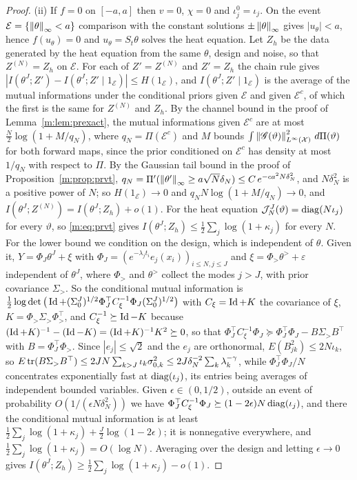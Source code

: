 \begin{proof}
(ii) If $f=0$ on $[-a,a]$ then $v=0$, $\chi=0$ and $\iota^0_j=\iota_j$. On the event $\mathcal E=\{\left\|\theta\right\|_\infty<a\}$ comparison with the constant solutions $\pm\left\|\theta\right\|_\infty$ gives $|u_\theta|<a$, hence $f(u_\theta)=0$ and $u_\theta=S_t\theta$ solves the heat equation. Let $Z_h$ be the data generated by the heat equation from the same $\theta$, design and noise, so that $Z^{(N)}=Z_h$ on $\mathcal E$. For each of $Z'=Z^{(N)}$ and $Z'=Z_h$ the chain rule gives $|I(\theta^J;Z')-I(\theta^J;Z'\mid1_{\mathcal E})|\le H(1_{\mathcal E})$, and $I(\theta^J;Z'\mid1_{\mathcal E})$ is the average of the mutual informations under the conditional priors given $\mathcal E$ and given $\mathcal E^c$, of which the first is the same for $Z^{(N)}$ and $Z_h$. By the channel bound in the proof of Lemma~\ref{m:lem:prexact}, the mutual informations given $\mathcal E^c$ are at most $\tfrac N2\log(1+M/q_N)$, where $q_N=\Pi(\mathcal E^c)$ and $M$ bounds $\int\left\|\mathscr{G}(\vartheta)\right\|^2_{L^\infty(\mathcal X)}\,d\Pi(\vartheta)$ for both forward maps, since the prior conditioned on $\mathcal E^c$ has density at most $1/q_N$ with respect to $\Pi$. By the Gaussian tail bound in the proof of Proposition~\ref{m:prop:prvt}, $q_N=\Pi'(\left\|\theta'\right\|_\infty\ge a\sqrt N\delta_N)\le C\,e^{-ca^2N\delta_N^2}$, and $N\delta_N^2$ is a positive power of $N$; so $H(1_{\mathcal E})\to0$ and $q_NN\log(1+M/q_N)\to0$, and $I(\theta^J;Z^{(N)})=I(\theta^J;Z_h)+o(1)$. For the heat equation $\mathcal J^J_N(\vartheta)=\operatorname{diag}(N\iota_j)$ for every $\vartheta$, so \eqref{m:eq:prvt} gives $I(\theta^J;Z_h)\le\tfrac12\sum_j\log(1+\kappa_j)$ for every $N$. For the lower bound we condition on the design, which is independent of $\theta$. Given it, $Y=\Phi_J\theta^J+\xi$ with $\Phi_J=(e^{-\lambda_jt_i}e_j(x_i))_{i\le N,j\le J}$ and $\xi=\Phi_>\theta^>+\varepsilon$ independent of $\theta^J$, where $\Phi_>$ and $\theta^>$ collect the modes $j>J$, with prior covariance $\Sigma_>$. So the conditional mutual information is $\tfrac12\log\det\big(\operatorname{Id}+(\Sigma^J_0)^{1/2}\Phi_J^\top C_\xi^{-1}\Phi_J(\Sigma^J_0)^{1/2}\big)$ with $C_\xi=\operatorname{Id}+K$ the covariance of $\xi$, $K=\Phi_>\Sigma_>\Phi_>^\top$, and $C_\xi^{-1}\succeq\operatorname{Id}-K$ because $(\operatorname{Id}+K)^{-1}-(\operatorname{Id}-K)=(\operatorname{Id}+K)^{-1}K^2\succeq0$, so that $\Phi_J^\top C_\xi^{-1}\Phi_J\succeq\Phi_J^\top\Phi_J-B\Sigma_>B^\top$ with $B=\Phi_J^\top\Phi_>$. Since $|e_j|\le\sqrt2$ and the $e_j$ are orthonormal, $E(B_{jk}^2)\le2N\iota_k$, so $E\,\mathrm{tr}(B\Sigma_>B^\top)\le2JN\sum_{k>J}\iota_k\sigma^2_{0,k}\le2J\delta_N^{-2}\sum_k\lambda_k^{-\gamma}$, while $\Phi_J^\top\Phi_J/N$ concentrates exponentially fast at $\operatorname{diag}(\iota_j)$, its entries being averages of independent bounded variables. Given $\epsilon\in(0,1/2)$, outside an event of probability $O(1/(\epsilon N\delta_N^2))$ we have $\Phi_J^\top C_\xi^{-1}\Phi_J\succeq(1-2\epsilon)N\operatorname{diag}(\iota_j)$, and there the conditional mutual information is at least $\tfrac12\sum_j\log(1+\kappa_j)+\tfrac J2\log(1-2\epsilon)$; it is nonnegative everywhere, and $\tfrac12\sum_j\log(1+\kappa_j)=O(\log N)$. Averaging over the design and letting $\epsilon\to0$ gives $I(\theta^J;Z_h)\ge\tfrac12\sum_j\log(1+\kappa_j)-o(1)$.


\end{proof}
